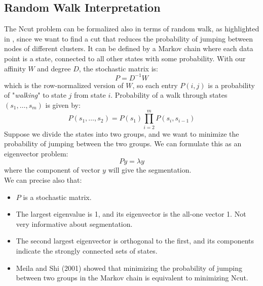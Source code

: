 \subsection{Random Walk Interpretation} 
The Ncut problem can be formalized also in terms of random walk, as highlighted in \cite{spectral_tutorial}, since we want to find a cut that reduces the probability of jumping between nodes of different clusters. It can be defined by a  Markov chain where each data point is a state, connected to all other states with some probability. With our affinity $W$ and degree $D$, the stochastic matrix is:
$$P=D^{-1}W$$
which is the row-normalized version of $W$, so each entry $P(i,j)$ is a probability of "\textit{walking}" to state $j$ from state  $i$\cite{randomwalk_spectral}.
Probability of a walk through states $( s _ { 1 } , \dots , s _ { m })$ is given by:
$$P \left( s _ { 1 } , \ldots , s _ { 2 } \right) = P \left( s _ { 1 } \right) \prod _ { i = 2 } ^ { m } P \left( s _ { i } , s _ { i - 1 } \right)$$
Suppose we divide the states into two groups, and we want to minimize the probability of jumping between the two groups. We can formulate this as an eigenvector problem:
$$P y = \lambda y$$
where the component of vector $y$ will give the segmentation.\\
We can precise also that:
\begin{itemize}
	\item $P$ is a stochastic matrix.
	\item The largest eigenvalue is 1, and its eigenvector is the all-one vector 1. Not very informative about segmentation.
	\item The second largest eigenvector is orthogonal to the first, and its components indicate the strongly connected sets of states.
	\item Meila and Shi (2001) showed that minimizing the probability of jumping between two groups in the Markov chain is equivalent to minimizing Ncut.
\end{itemize}
